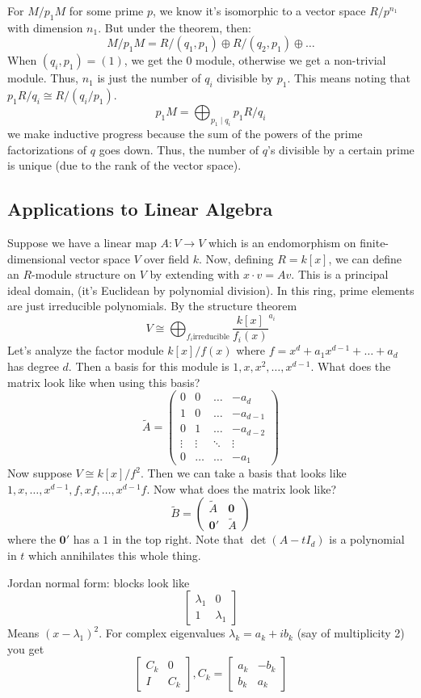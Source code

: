 For $M/p_1 M$ for some prime $p$, we know it's isomorphic to a vector space $R/p^{n_1}$
with dimension $n_1$. But under the theorem, then:
\[ M/p_1 M = R/(q_1, p_1) \oplus R/(q_2, p_1) \oplus \dots \]
When $(q_i, p_1) = (1)$, we get the $0$ module, otherwise we get a non-trivial module. Thus,
$n_1$ is just the number of $q_i$ divisible by $p_1$. This means noting that $p_1 R/q_i \cong R/(q_i/p_1)$.
\[ p_1 M = \bigoplus_{p_1 \mid q_i} p_1 R/q_i \]
we make inductive progress because the sum of the powers of the prime factorizations of $q$ goes down.
Thus, the number of $q$'s divisible by a certain prime is unique (due to the rank of the vector space).

\subsection{Applications to Linear Algebra}
Suppose we have a linear map $A: V \to V$ which is an endomorphism on finite-dimensional vector space $V$ over field $k$.
Now, defining $R = k[x]$, we can define an $R$-module structure on $V$
by extending with $x \cdot v = Av$. This is a principal ideal domain,
(it's Euclidean by polynomial division). In this ring, prime elements are just irreducible polynomials.
By the structure theorem
\[ V \cong \bigoplus_{f_i \text{irreducible}} \frac{k[x]}{f_i(x)}^{a_i} \]
Let's analyze the factor module
$k[x]/f(x)$ where $f = x^d + a_1 x^{d - 1} + \dots + a_d$ has degree $d$. Then a basis for this module is $1, x, x^2, \dots, x^{d - 1}$.
What does the matrix look like when using this basis?
\[ \tilde{A} = \begin{pmatrix}
    0 & 0 & \dots & -a_d\\
    1 & 0 & \dots & -a_{d - 1} \\
    0 & 1 & \dots & -a_{d - 2} \\
    \vdots & \vdots &\ddots & \vdots \\
    0 & \dots & \dots & -a_1
\end{pmatrix} \]
Now suppose $V \cong k[x]/f^2$. Then we can take a basis that looks like $1, x, \dots, x^{d - 1}, f, xf, \dots, x^{d - 1}f$.
Now what does the matrix look like?
\[ \tilde{B} = \begin{pmatrix}
    \tilde{A} & \mathbf{0} \\
    \mathbf{0'} & \tilde{A}
\end{pmatrix}
\]
where the $\mathbf{0'}$ has a $1$ in the top right.
Note that $\det(A - tI_d)$ is a polynomial in $t$ which annihilates this whole thing.

Jordan normal form:
blocks look like
\[\begin{bmatrix}
  \lambda_1 & 0 \\
  1 &  \lambda_1 
\end{bmatrix}\]
Means $(x- \lambda_1)^2$. For complex eigenvalues $\lambda_k = a_k + ib_k$
(say of multiplicity 2) you get
\[\begin{bmatrix}
    C_k & 0 \\
    I & C_k
\end{bmatrix}, C_k = \begin{bmatrix}
    a_k & -b_k \\
    b_k & a_k
\end{bmatrix}\]

